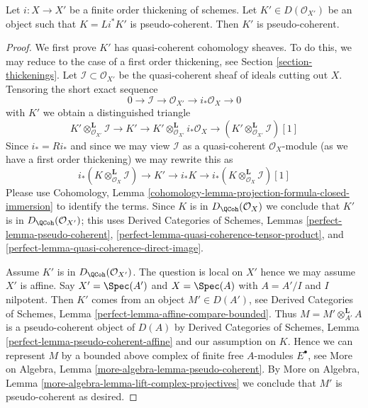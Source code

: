\begin{lemma}
\label{lemma-thickening-pseudo-coherent}
Let $i : X \to X'$ be a finite order thickening of schemes. Let
$K' \in D(\mathcal{O}_{X'})$ be an object such that
$K = Li^*K'$ is pseudo-coherent. Then $K'$ is pseudo-coherent.
\end{lemma}

\begin{proof}
We first prove $K'$ has quasi-coherent cohomology sheaves.
To do this, we may reduce to the case of a first order thickening, see
Section \ref{section-thickenings}. Let $\mathcal{I} \subset \mathcal{O}_{X'}$
be the quasi-coherent sheaf of ideals cutting out $X$.
Tensoring the short exact sequence
$$
0 \to \mathcal{I} \to \mathcal{O}_{X'} \to i_*\mathcal{O}_X \to 0
$$
with $K'$ we obtain a distinguished triangle
$$
K' \otimes_{\mathcal{O}_{X'}}^\mathbf{L} \mathcal{I}
\to K' \to
K' \otimes_{\mathcal{O}_{X'}}^\mathbf{L} i_*\mathcal{O}_X
\to
(K' \otimes_{\mathcal{O}_{X'}}^\mathbf{L} \mathcal{I})[1]
$$
Since $i_* = Ri_*$ and since we may view $\mathcal{I}$
as a quasi-coherent $\mathcal{O}_X$-module (as we have a first
order thickening) we may rewrite this as
$$
i_*(K \otimes_{\mathcal{O}_X}^\mathbf{L} \mathcal{I})
\to K' \to
i_*K \to
i_*(K \otimes_{\mathcal{O}_X}^\mathbf{L} \mathcal{I})[1]
$$
Please use Cohomology, Lemma
\ref{cohomology-lemma-projection-formula-closed-immersion}
to identify the terms. Since $K$ is in
$D_\QCoh(\mathcal{O}_X)$ we conclude that
$K'$ is in $D_\QCoh(\mathcal{O}_{X'})$; this uses
Derived Categories of Schemes, Lemmas
\ref{perfect-lemma-pseudo-coherent},
\ref{perfect-lemma-quasi-coherence-tensor-product}, and
\ref{perfect-lemma-quasi-coherence-direct-image}.

\medskip\noindent
Assume $K'$ is in $D_\QCoh(\mathcal{O}_{X'})$.
The question is local on $X'$ hence we may assume $X'$ is affine.
Say $X' = \Spec(A')$ and $X = \Spec(A)$ with $A = A'/I$ and $I$ nilpotent.
Then $K'$ comes from an object $M' \in D(A')$, see
Derived Categories of Schemes, Lemma
\ref{perfect-lemma-affine-compare-bounded}.
Thus $M = M' \otimes_{A'}^\mathbf{L} A$ is a pseudo-coherent
object of $D(A)$ by Derived Categories of Schemes,
Lemma \ref{perfect-lemma-pseudo-coherent-affine} and our assumption on $K$.
Hence we can represent $M$
by a bounded above complex of finite free $A$-modules $E^\bullet$, see
More on Algebra, Lemma \ref{more-algebra-lemma-pseudo-coherent}.
By More on Algebra, Lemma
\ref{more-algebra-lemma-lift-complex-projectives}
we conclude that $M'$ is pseudo-coherent as desired.
\end{proof}

